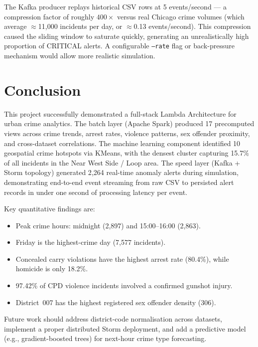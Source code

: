 \documentclass[11pt,a4paper]{article}
\begin{document}
The Kafka producer replays historical CSV rows at 5 events/second — a
compression factor of roughly $400\times$ versus real Chicago crime
volumes (which average $\approx$11{,}000 incidents per day, or
$\approx$0.13 events/second). This compression caused the sliding window
to saturate quickly, generating an unrealistically high proportion of
CRITICAL alerts. A configurable \texttt{--rate} flag or back-pressure
mechanism would allow more realistic simulation.

\section{Conclusion}

This project successfully demonstrated a full-stack Lambda Architecture
for urban crime analytics. The batch layer (Apache Spark) produced
17 precomputed views across crime trends, arrest rates, violence
patterns, sex offender proximity, and cross-dataset correlations. The
machine learning component identified 10 geospatial crime hotspots
via KMeans, with the densest cluster capturing 15.7\% of all
incidents in the Near West Side / Loop area. The speed layer (Kafka +
Storm topology) generated 2{,}264 real-time anomaly alerts during
simulation, demonstrating end-to-end event streaming from raw CSV to
persisted alert records in under one second of processing latency per
event.

Key quantitative findings are:
\begin{itemize}[noitemsep]
  \item Peak crime hours: midnight (2{,}897) and 15:00–16:00 (2{,}863).
  \item Friday is the highest-crime day (7{,}577 incidents).
  \item Concealed carry violations have the highest arrest rate (80.4\%),
    while homicide is only 18.2\%.
  \item 97.42\% of CPD violence incidents involved a confirmed gunshot
    injury.
  \item District~007 has the highest registered sex offender density (306).
\end{itemize}

Future work should address district-code normalisation across datasets,
implement a proper distributed Storm deployment, and add a predictive
model (e.g., gradient-boosted trees) for next-hour crime type forecasting.
\end{document}
